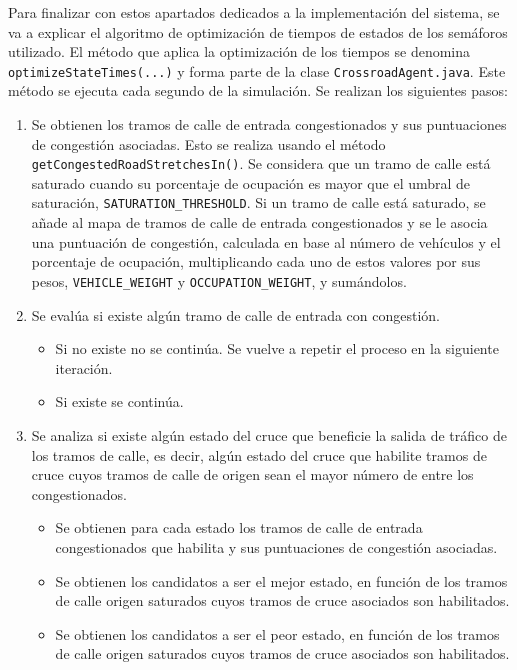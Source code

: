 Para finalizar con estos apartados dedicados a la implementación del sistema, se va a explicar el algoritmo de optimización de tiempos de estados de los semáforos utilizado. El método que aplica la optimización de los tiempos se denomina \lstinline{optimizeStateTimes(...)} y forma parte de la clase \lstinline{CrossroadAgent.java}. Este método se ejecuta cada segundo de la simulación. Se realizan los siguientes pasos:
\begin{enumerate}
    \item Se obtienen los tramos de calle de entrada congestionados y sus puntuaciones de congestión asociadas. Esto se realiza usando el método \lstinline{getCongestedRoadStretchesIn()}. Se considera que un tramo de calle está saturado cuando su porcentaje de ocupación es mayor que el umbral de saturación, \lstinline{SATURATION_THRESHOLD}. Si un tramo de calle está saturado, se añade al mapa de tramos de calle de entrada congestionados y se le asocia una puntuación de congestión, calculada en base al número de vehículos y el porcentaje de ocupación, multiplicando cada uno de estos valores por sus pesos, \lstinline{VEHICLE_WEIGHT} y \lstinline{OCCUPATION_WEIGHT}, y sumándolos.
    \item Se evalúa si existe algún tramo de calle de entrada con congestión. 
        \begin{itemize}
            \item Si no existe no se continúa. Se vuelve a repetir el proceso en la siguiente iteración.
            \item Si existe se continúa.
        \end{itemize}
    \item Se analiza si existe algún estado del cruce que beneficie la salida de tráfico de los tramos de calle, es decir, algún estado del cruce que habilite tramos de cruce cuyos tramos de calle de origen sean el mayor número de entre los congestionados.
    \begin{itemize}
        \item Se obtienen para cada estado los tramos de calle de entrada congestionados que habilita y sus puntuaciones de congestión asociadas.
        \item Se obtienen los candidatos a ser el mejor estado, en función de los tramos de calle origen saturados cuyos tramos de cruce asociados son habilitados.
        \item Se obtienen los candidatos a ser el peor estado, en función de los tramos de calle origen saturados cuyos tramos de cruce asociados son habilitados.

\end{itemize}
\end{enumerate}
